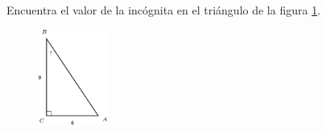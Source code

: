 Encuentra el valor de la incógnita en el triángulo de la figura \ref{fig:angle_functrig_25}.
\begin{figure}[H]
    \begin{center}
        \includegraphics[width=0.2\textwidth]{../images/angle_functrig_25.png}
    \end{center}
    \caption{}
    \label{fig:angle_functrig_25}
\end{figure}